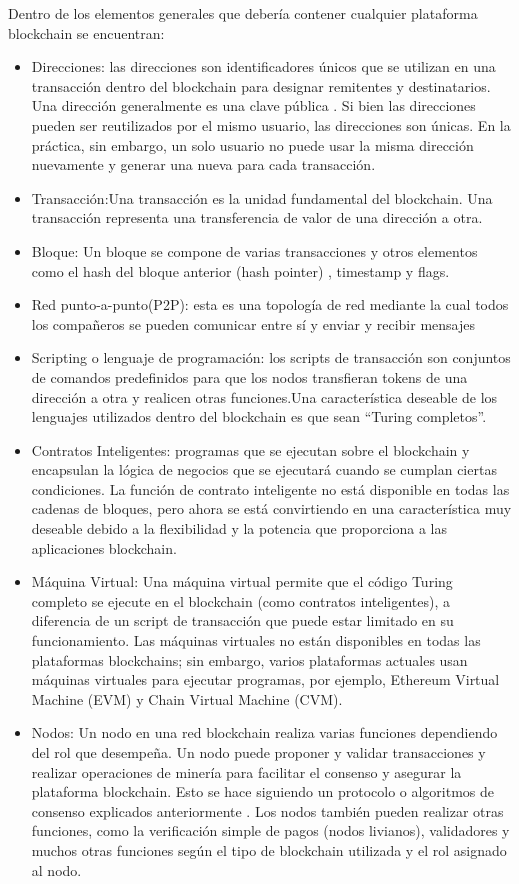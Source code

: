 Dentro de los elementos generales que debería contener cualquier plataforma blockchain se encuentran:
\begin{itemize}
    \item Direcciones: las direcciones son identificadores únicos que se utilizan en una transacción dentro del blockchain para designar remitentes y destinatarios. Una dirección generalmente es una clave pública . Si bien las direcciones pueden ser reutilizados por el mismo usuario, las direcciones son únicas. En la práctica, sin embargo, un solo usuario no puede usar la misma dirección nuevamente y generar una nueva para cada transacción. 
    \item Transacción:Una transacción es la unidad fundamental del blockchain. Una transacción representa una transferencia de valor de una dirección a otra.
    \item Bloque: Un bloque se compone de varias transacciones y otros elementos como el hash del bloque anterior (hash pointer) , timestamp y flags.
    \item Red punto-a-punto(P2P): esta es una topología de red mediante la cual todos los compañeros se pueden comunicar entre sí y enviar y recibir mensajes
    \item Scripting o lenguaje de programación: los scripts de transacción son conjuntos de comandos predefinidos para que los nodos transfieran tokens de una dirección a otra y realicen otras funciones.Una característica deseable de los lenguajes utilizados dentro del blockchain es que sean “Turing completos”.
    \item Contratos Inteligentes: programas que se ejecutan sobre el blockchain y encapsulan la lógica de negocios que se ejecutará cuando se cumplan ciertas condiciones. La función de contrato inteligente no está disponible en todas las cadenas de bloques, pero ahora se está convirtiendo en una característica muy deseable debido a la flexibilidad y la potencia que proporciona a las aplicaciones blockchain.
    \item Máquina Virtual: Una máquina virtual permite que el código Turing completo se ejecute en el blockchain (como contratos inteligentes), a diferencia  de un script de transacción que puede estar limitado en su funcionamiento. Las máquinas virtuales no están disponibles en todas las plataformas  blockchains; sin embargo, varios plataformas actuales usan máquinas virtuales para ejecutar programas, por ejemplo, Ethereum Virtual Machine (EVM) y Chain Virtual Machine (CVM).
    \item Nodos: Un nodo en una red blockchain realiza varias funciones dependiendo del rol que desempeña. Un nodo puede proponer y validar transacciones y realizar operaciones de minería para facilitar el consenso y asegurar la plataforma blockchain. Esto se hace siguiendo un protocolo o algoritmos de consenso explicados anteriormente . Los nodos también pueden realizar otras funciones, como la verificación simple de pagos (nodos livianos), validadores y muchos otras funciones según el tipo de blockchain utilizada y el rol asignado al nodo.
\end{itemize}

